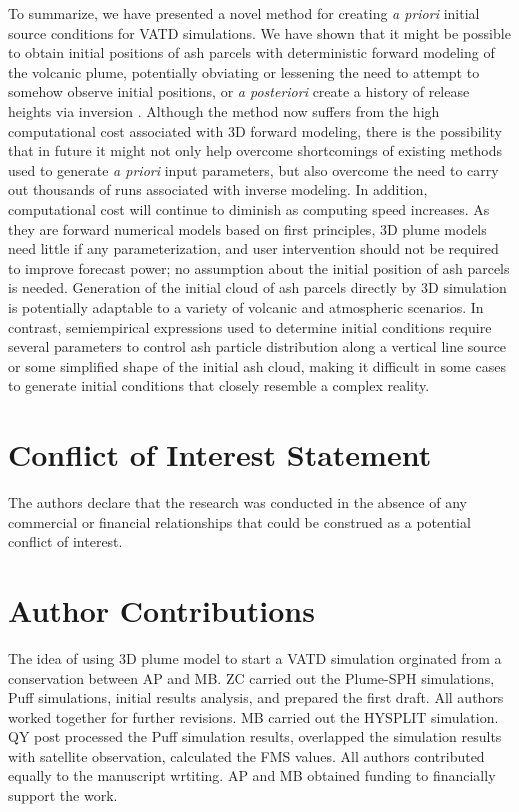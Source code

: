 \documentclass[utf8]{frontiersSCNS} %
\begin{document}
To summarize, we have presented a novel method for creating \textit{a priori} initial source conditions for VATD simulations. We have shown that it might be possible to obtain initial positions of ash parcels with deterministic forward modeling of the volcanic plume, potentially obviating or lessening the need to attempt to somehow observe initial positions, or \textit{a posteriori} create a history of release heights via inversion \citep{stohl2011determination}. Although the method now suffers from the high computational cost associated with 3D forward modeling, there is the possibility that in future it might not only help overcome shortcomings of existing methods used to generate \textit{a priori} input parameters, but also overcome the need to carry out thousands of runs associated with inverse modeling. In addition, computational cost will continue to diminish as computing speed increases. As they are forward numerical models based on first principles, 3D plume models need little if any parameterization, and user intervention should not be required to improve forecast power; no assumption about the initial position of ash parcels is needed. Generation of the initial cloud of ash parcels directly by 3D simulation is potentially adaptable to a variety of volcanic and atmospheric scenarios. In contrast, semiempirical expressions used to determine initial conditions require several parameters to control ash particle distribution along a vertical line source or some simplified shape of the initial ash cloud, making it difficult in some cases to generate initial conditions that closely resemble a complex reality. 

\section*{Conflict of Interest Statement}

The authors declare that the research was conducted in the absence of any commercial or financial relationships that could be construed as a potential conflict of interest.

\section*{Author Contributions}
The idea of using 3D plume model to start a VATD simulation orginated from a conservation between AP and MB. ZC carried out the Plume-SPH simulations, Puff simulations, initial results analysis, and prepared the first draft. All authors worked together for further revisions.  MB carried out the HYSPLIT simulation. QY post processed the Puff simulation results, overlapped the simulation results with satellite observation, calculated the FMS values. All authors contributed equally to the manuscript wrtiting. AP and MB obtained funding to financially support the work.
\end{document}
